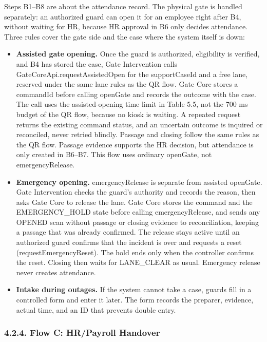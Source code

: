 Steps B1--B8 are about the attendance record. The physical gate is handled separately: an authorized guard can open it for an employee right after B4, without waiting for HR, because HR approval in B6 only decides attendance. Three rules cover the gate side and the case where the system itself is down:

\begin{itemize}[leftmargin=36pt, itemsep=2pt, topsep=4pt, parsep=2pt]
  \item \textbf{Assisted gate opening.} Once the guard is authorized, eligibility is verified, and B4 has stored the case, Gate Intervention calls GateCoreApi.requestAssistedOpen for the supportCaseId and a free lane, reserved under the same lane rules as the QR flow. Gate Core stores a commandId before calling openGate and records the outcome with the case. The call uses the assisted-opening time limit in Table 5.5, not the 700 ms budget of the QR flow, because no kiosk is waiting. A repeated request returns the existing command status, and an uncertain outcome is inquired or reconciled, never retried blindly. Passage and closing follow the same rules as the QR flow. Passage evidence supports the HR decision, but attendance is only created in B6--B7. This flow uses ordinary openGate, not emergencyRelease.
  \item \textbf{Emergency opening.} emergencyRelease is separate from assisted openGate. Gate Intervention checks the guard's authority and records the reason, then asks Gate Core to release the lane. Gate Core stores the command and the EMERGENCY\_HOLD state before calling emergencyRelease, and sends any OPENED scan without passage or closing evidence to reconciliation, keeping a passage that was already confirmed. The release stays active until an authorized guard confirms that the incident is over and requests a reset (requestEmergencyReset). The hold ends only when the controller confirms the reset. Closing then waits for LANE\_CLEAR as usual. Emergency release never creates attendance.
  \item \textbf{Intake during outages.} If the system cannot take a case, guards fill in a controlled form and enter it later. The form records the preparer, evidence, actual time, and an ID that prevents double entry.
\end{itemize}

\subsubsection*{4.2.4. Flow C: HR/Payroll Handover}

